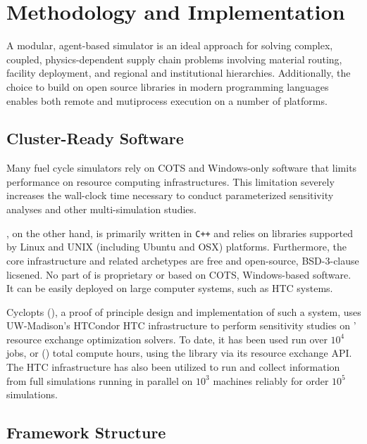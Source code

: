\section{Methodology and Implementation}

A modular, agent-based simulator is an ideal approach for solving complex, coupled,
physics-dependent supply chain problems involving material routing, facility
deployment, and regional and institutional hierarchies. Additionally, the choice to 
build \Cyclus on open source libraries in modern programming languages enables 
both remote and mutiprocess execution on a number of platforms.

\subsection{Cluster-Ready Software}

Many fuel cycle simulators rely on \gls{COTS} and Windows-only software that limits 
performance on resource computing infrastructures. This limitation severely 
increases the wall-clock time necessary to conduct parameterized sensitivity 
analyses and other multi-simulation studies. 

\Cyclus, on the other hand, is primarily written in \texttt{C++} and relies on 
libraries supported by Linux and UNIX (including Ubuntu and OSX) platforms. 
Furthermore, the core infrastructure and related archetypes are free and 
open-source, BSD-3-clause licsened. No part of \Cyclus is proprietary or based 
on \gls{COTS}, Windows-based software. It can be easily deployed 
on large computer systems, such as \acrlong{HTC} systems.

Cyclopts (), a proof of principle design and implementation of such a
system, uses UW-Madison's HTCondor HTC infrastructure to perform sensitivity
studies on \Cyclus' resource exchange optimization solvers. To date, it has been
used run over $10^4$ jobs, or () total compute hours, using
the \Cyclus library via its resource exchange \gls{API}.
The HTC infrastructure has also been utilized to run and collect
information from full \Cyclus simulations running in parallel on $10^3$
machines reliably for order $10^5$ simulations.


\subsection{Framework Structure}

